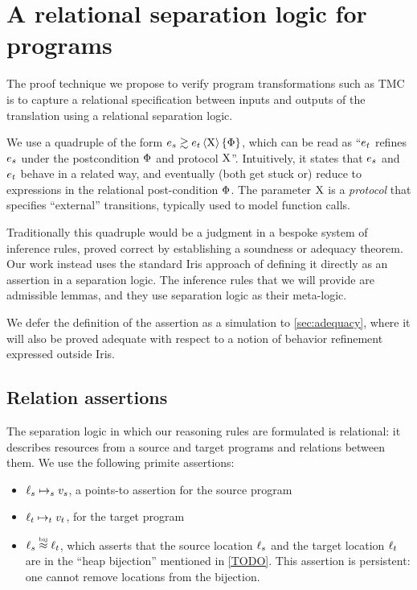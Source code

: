 \section{A relational separation logic for \DataLang programs}
\label{sec:reasoning_rules}

The proof technique we propose to verify program transformations such
as TMC is to capture a relational specification between inputs and
outputs of the translation using a relational separation logic.

We use a quadruple of the form $\iSim[\iProt]{\iPred}{\datalangExpr_s}{\datalangExpr_t}$, which can be read as ``$\datalangExpr_t$ refines $\datalangExpr_s$ under the postcondition $\Phi$ and protocol $\mathrm{X}$''. Intuitively, it states that $\datalangExpr_s$ and $\datalangExpr_t$ behave in a related way, and eventually (both get stuck or) reduce to expressions in the relational post-condition $\Phi$. The parameter $\mathrm{X}$ is a \emph{protocol} that specifies ``external'' transitions, typically used to model function calls.

Traditionally this quadruple would be a judgment in a bespoke system of inference rules, proved correct by establishing a soundness or adequacy theorem. Our work instead uses the standard Iris approach of defining it directly as an assertion in a separation logic. The inference rules that we will provide are admissible lemmas, and they use separation logic as their meta-logic.

We defer the definition of the assertion as a simulation to \cref{sec:adequacy}, where it will also be proved adequate with respect to a notion of behavior refinement expressed outside Iris.

\subsection{Relation assertions}

The separation logic in which our reasoning rules are formulated is relational: it describes resources from a source and target programs and relations between them. We use the following primite assertions:

\begin{itemize}
\item $\datalangLoc_s \iPointsto_s \datalangVal_s$, a points-to assertion for the source program
\item $\datalangLoc_t \iPointsto_t \datalangVal_t$, for the target program
\item $\datalangLoc_s \iInBij \datalangLoc_t$, which asserts that the source location
  $\datalangLoc_s$ and the target location $\datalangLoc_t$ are in the ``heap
  bijection'' mentioned in \cref{TODO}. This assertion is
  persistent: one cannot remove locations from the bijection.
\end{itemize}

